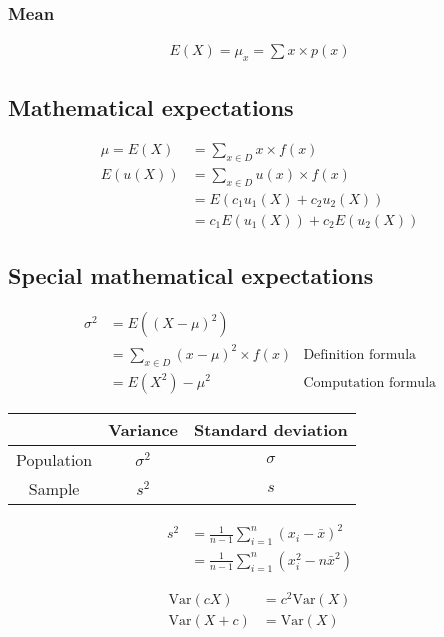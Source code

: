 \documentclass{article}
\newcommand{\var}{\text{Var}}
\begin{document}
\begin{multicols*}{2}
\subsubsection{Mean}
\begin{align*}
    E(X) = \mu_x = \sum x \times p(x)
\end{align*}

\subsection{Mathematical expectations}

\begin{align*}
    \mu = E(X) &= \sum_{x \in D} x \times f(x) \\
    E(u(X)) &= \sum_{x \in D} u(x) \times f(x) \\
    &= E(c_1 u_1(X) + c_2 u_2(X)) \\
    &= c_1 E(u_1(X)) + c_2 E(u_2(X))
\end{align*}

\subsection{Special mathematical expectations}

\begin{align*}
    \sigma^2 &= E((X - \mu)^2) \\
    &= \sum_{x \in D} (x - \mu)^2 \times f(x) & \text{Definition formula} \\
    &= E(X^2) - \mu^2 & \text{Computation formula}
\end{align*}

\begin{center}
    \begin{tabular}{|c|c|c|}
        \hline
        & Variance & Standard deviation \\ \hline
        Population & $\sigma^2$ & $\sigma$ \\ \hline
        Sample & $s^2$ & $s$ \\ \hline
    \end{tabular}
\end{center}

\begin{align*}
    s^2 &= \frac{1}{n - 1} \sum_{i = 1}^n (x_i - \bar{x})^2 \\
    &= \frac{1}{n - 1} \sum_{i = 1}^n (x_i^2 - n\bar{x}^2)
\end{align*}

\begin{align*}
    \var(cX) &= c^2 \var(X) \\
    \var(X + c) &= \var(X)
\end{align*}


\end{multicols*}
\end{document}
